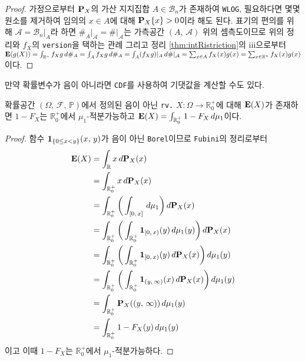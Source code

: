 \begin{proof}
    가정으로부터 $\mathbf{P}_X$의 가산 지지집합 $A\in\mathcal{B}_n$가 존재하여 \texttt{WLOG}, 필요하다면 몇몇 원소를 제거하여 임의의 $x\in A$에 대해 $\mathbf{P}_X\{x\}>0$이라 해도 된다. 표기의 편의를 위해 $\mathcal{A}=\mathcal{B}_n\vert_A$라 하면 $\#_A\vert_\mathcal{A}=\#\vert_\mathcal{A}$는 가측공간 $(A,\,\mathcal{A})$ 위의 셈측도이므로 위의 정리와 $f_X$의 \texttt{version}을 택하는 관례 그리고 정리 \ref{thm:intRistriction}의 iii으로부터 $\mathbf{E}(g(X))=\int_{\mathbb{R}^n}f_Xg\,d\#_A=\int_Af_Xg\,d\#_A=\int_A(f_Xg)\vert_A\,d\#\vert_\mathcal{A}=\sum_{x\in A}f_X(x)g(x)=\sum_{x\in\mathbb{R}^n}f_X(x)g(x)$이다.
\end{proof}

만약 확률변수가 음이 아니라면 \texttt{CDF}를 사용하여 기댓값을 계산할 수도 있다.

\begin{theorem}
    확률공간 $(\Omega,\,\mathcal{F},\,\mathbb{P})$에서 정의된 음이 아닌 \texttt{rv.} $X:\Omega\to\mathbb{R}_0^+$에 대해 $\mathbf{E}(X)$가 존재하면 $1-F_X$는 $\mathbb{R}_0^+$에서 $\mu_1$-적분가능하고 $\mathbf{E}(X)=\int_{\mathbb{R}_0^+}1-F_X\,d\mu_1$이다.
\end{theorem}

\begin{proof}
    함수 $\mathbf{1}_{\{0\leq x<y\}}(x,\,y)$가 음이 아닌 \texttt{Borel}이므로 \texttt{Fubini}의 정리로부터
    \begin{align*}
        \mathbf{E}(X)&=\int_\mathbb{R}x\,d\mathbf{P}_X(x)\\
        &=\int_{\mathbb{R}_0^+}x\,d\mathbf{P}_X(x)\\
        &=\int_{\mathbb{R}_0^+}\bigg(\int_{[0,\,x]}\,d\mu_1\bigg)\,d\mathbf{P}_X(x)\\
        &=\int_{\mathbb{R}_0^+}\bigg(\int_{\mathbb{R}_0^+}\mathbf{1}_{[0,\,x)}(y)\,d\mu_1(y)\bigg)\,d\mathbf{P}_X(x)\\
        &=\int_{\mathbb{R}_0^+}\bigg(\int_{\mathbb{R}_0^+}\mathbf{1}_{[0,\,x)}(y)\,d\mathbf{P}_X(x)\bigg)\,d\mu_1(y)\\
        &=\int_{\mathbb{R}_0^+}\bigg(\int_{\mathbb{R}_0^+}\mathbf{1}_{(y,\,\infty)}(x)\,d\mathbf{P}_X(x)\bigg)\,d\mu_1(y)\\
        &=\int_{\mathbb{R}_0^+}\mathbf{P}_X((y,\,\infty))\,d\mu_1(y)\\
        &=\int_{\mathbb{R}_0^+}1-F_X(y)\,d\mu_1(y)
    \end{align*}
    이고 이때 $1-F_X$는 $\mathbb{R}_0^+$에서 $\mu_1$-적분가능하다.
\end{proof}

